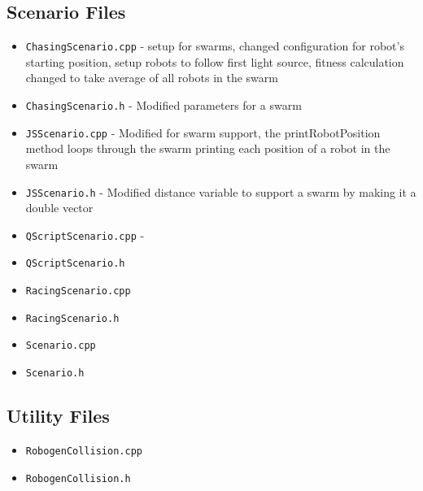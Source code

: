 \documentclass[11pt,a4paper]{article}
\begin{document}
\subsection{Scenario Files}
\begin{itemize}
    \item \texttt{ChasingScenario.cpp} - setup for swarms, changed
        configuration for robot's starting position, setup robots to follow
        first light source, fitness calculation changed to take average of all
        robots in the swarm
    \item \texttt{ChasingScenario.h} - Modified parameters for a swarm
    \item \texttt{JSScenario.cpp} - Modified for swarm support, the
        printRobotPosition method loops through the swarm printing each position
        of a robot in the swarm
    \item \texttt{JSScenario.h} - Modified distance variable to support a swarm
        by making it a double vector
    \item \texttt{QScriptScenario.cpp} -
    \item \texttt{QScriptScenario.h}
    \item \texttt{RacingScenario.cpp}
    \item \texttt{RacingScenario.h}
    \item \texttt{Scenario.cpp}
    \item \texttt{Scenario.h}
\end{itemize}

\subsection{Utility Files}
\begin{itemize}
    \item \texttt{RobogenCollision.cpp}
    \item \texttt{RobogenCollision.h}
\end{itemize}
\end{document}
